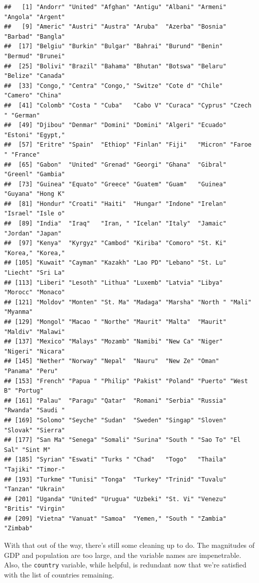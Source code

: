 \documentclass[12pt,oneside,openany]{book}
\begin{document}
\begin{verbatim}
##   [1] "Andorr" "United" "Afghan" "Antigu" "Albani" "Armeni" "Angola" "Argent"
##   [9] "Americ" "Austri" "Austra" "Aruba"  "Azerba" "Bosnia" "Barbad" "Bangla"
##  [17] "Belgiu" "Burkin" "Bulgar" "Bahrai" "Burund" "Benin"  "Bermud" "Brunei"
##  [25] "Bolivi" "Brazil" "Bahama" "Bhutan" "Botswa" "Belaru" "Belize" "Canada"
##  [33] "Congo," "Centra" "Congo," "Switze" "Cote d" "Chile"  "Camero" "China" 
##  [41] "Colomb" "Costa " "Cuba"   "Cabo V" "Curaca" "Cyprus" "Czech " "German"
##  [49] "Djibou" "Denmar" "Domini" "Domini" "Algeri" "Ecuado" "Estoni" "Egypt,"
##  [57] "Eritre" "Spain"  "Ethiop" "Finlan" "Fiji"   "Micron" "Faroe " "France"
##  [65] "Gabon"  "United" "Grenad" "Georgi" "Ghana"  "Gibral" "Greenl" "Gambia"
##  [73] "Guinea" "Equato" "Greece" "Guatem" "Guam"   "Guinea" "Guyana" "Hong K"
##  [81] "Hondur" "Croati" "Haiti"  "Hungar" "Indone" "Irelan" "Israel" "Isle o"
##  [89] "India"  "Iraq"   "Iran, " "Icelan" "Italy"  "Jamaic" "Jordan" "Japan" 
##  [97] "Kenya"  "Kyrgyz" "Cambod" "Kiriba" "Comoro" "St. Ki" "Korea," "Korea,"
## [105] "Kuwait" "Cayman" "Kazakh" "Lao PD" "Lebano" "St. Lu" "Liecht" "Sri La"
## [113] "Liberi" "Lesoth" "Lithua" "Luxemb" "Latvia" "Libya"  "Morocc" "Monaco"
## [121] "Moldov" "Monten" "St. Ma" "Madaga" "Marsha" "North " "Mali"   "Myanma"
## [129] "Mongol" "Macao " "Northe" "Maurit" "Malta"  "Maurit" "Maldiv" "Malawi"
## [137] "Mexico" "Malays" "Mozamb" "Namibi" "New Ca" "Niger"  "Nigeri" "Nicara"
## [145] "Nether" "Norway" "Nepal"  "Nauru"  "New Ze" "Oman"   "Panama" "Peru"  
## [153] "French" "Papua " "Philip" "Pakist" "Poland" "Puerto" "West B" "Portug"
## [161] "Palau"  "Paragu" "Qatar"  "Romani" "Serbia" "Russia" "Rwanda" "Saudi "
## [169] "Solomo" "Seyche" "Sudan"  "Sweden" "Singap" "Sloven" "Slovak" "Sierra"
## [177] "San Ma" "Senega" "Somali" "Surina" "South " "Sao To" "El Sal" "Sint M"
## [185] "Syrian" "Eswati" "Turks " "Chad"   "Togo"   "Thaila" "Tajiki" "Timor-"
## [193] "Turkme" "Tunisi" "Tonga"  "Turkey" "Trinid" "Tuvalu" "Tanzan" "Ukrain"
## [201] "Uganda" "United" "Urugua" "Uzbeki" "St. Vi" "Venezu" "Britis" "Virgin"
## [209] "Vietna" "Vanuat" "Samoa"  "Yemen," "South " "Zambia" "Zimbab"
\end{verbatim}

With that out of the way, there's still some cleaning up to do. The
magnitudes of GDP and population are too large, and the variable names
are impenetrable. Also, the \texttt{country} variable, while helpful, is
redundant now that we're satisfied with the list of countries remaining.
\end{document}
